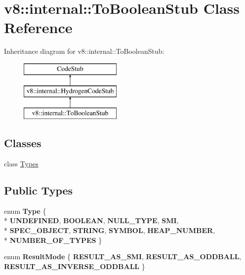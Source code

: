 \hypertarget{classv8_1_1internal_1_1_to_boolean_stub}{}\section{v8\+:\+:internal\+:\+:To\+Boolean\+Stub Class Reference}
\label{classv8_1_1internal_1_1_to_boolean_stub}
Inheritance diagram for v8\+:\+:internal\+:\+:To\+Boolean\+Stub\+:\begin{figure}[H]
\begin{center}
\leavevmode
\includegraphics[height=3.000000cm]{classv8_1_1internal_1_1_to_boolean_stub}
\end{center}
\end{figure}
\subsection*{Classes}
\begin{DoxyCompactItemize}
\item 
class \hyperlink{classv8_1_1internal_1_1_to_boolean_stub_1_1_types}{Types}
\end{DoxyCompactItemize}
\subsection*{Public Types}
\begin{DoxyCompactItemize}
\item 
\hypertarget{classv8_1_1internal_1_1_to_boolean_stub_a6cb90d234a0c853704206e624271ceda}{}enum {\bfseries Type} \{ \\*
{\bfseries U\+N\+D\+E\+F\+I\+N\+E\+D}, 
{\bfseries B\+O\+O\+L\+E\+A\+N}, 
{\bfseries N\+U\+L\+L\+\_\+\+T\+Y\+P\+E}, 
{\bfseries S\+M\+I}, 
\\*
{\bfseries S\+P\+E\+C\+\_\+\+O\+B\+J\+E\+C\+T}, 
{\bfseries S\+T\+R\+I\+N\+G}, 
{\bfseries S\+Y\+M\+B\+O\+L}, 
{\bfseries H\+E\+A\+P\+\_\+\+N\+U\+M\+B\+E\+R}, 
\\*
{\bfseries N\+U\+M\+B\+E\+R\+\_\+\+O\+F\+\_\+\+T\+Y\+P\+E\+S}
 \}\label{classv8_1_1internal_1_1_to_boolean_stub_a6cb90d234a0c853704206e624271ceda}

\item 
\hypertarget{classv8_1_1internal_1_1_to_boolean_stub_a7161797d2245a2d5af538c5607fdd726}{}enum {\bfseries Result\+Mode} \{ {\bfseries R\+E\+S\+U\+L\+T\+\_\+\+A\+S\+\_\+\+S\+M\+I}, 
{\bfseries R\+E\+S\+U\+L\+T\+\_\+\+A\+S\+\_\+\+O\+D\+D\+B\+A\+L\+L}, 
{\bfseries R\+E\+S\+U\+L\+T\+\_\+\+A\+S\+\_\+\+I\+N\+V\+E\+R\+S\+E\+\_\+\+O\+D\+D\+B\+A\+L\+L}
 \}\label{classv8_1_1internal_1_1_to_boolean_stub_a7161797d2245a2d5af538c5607fdd726}

\end{DoxyCompactItemize}
